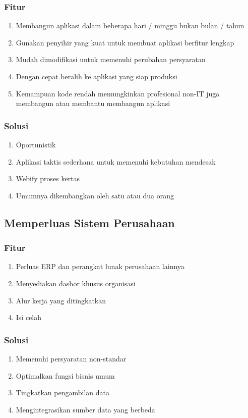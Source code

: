 \documentclass{article}
\begin{document}
\subsubsection{Fitur}
\begin{enumerate}
    \item Membangun aplikasi dalam beberapa hari / minggu bukan bulan / tahun
    \item Gunakan penyihir yang kuat untuk membuat aplikasi berfitur lengkap
    \item Mudah dimodifikasi untuk memenuhi perubahan persyaratan
    \item Dengan cepat beralih ke aplikasi yang siap produksi
    \item Kemampuan kode rendah memungkinkan profesional non-IT juga membangun atau membantu membangun aplikasi
    \end{enumerate}
\subsubsection{Solusi}
\begin{enumerate}
    \item Oportunistik
    \item Aplikasi taktis sederhana untuk memenuhi kebutuhan mendesak
    \item Webify proses kertas
    \item Umumnya dikembangkan oleh satu atau dua orang
    \end{enumerate}
 
\subsection{Memperluas Sistem Perusahaan}
\subsubsection{Fitur}
\begin{enumerate}  
    \item Perluas ERP dan perangkat lunak perusahaan lainnya
    \item Menyediakan dasbor khusus organisasi
    \item Alur kerja yang ditingkatkan
    \item Isi celah
    \end{enumerate}
\subsubsection{Solusi}
\begin{enumerate}  
    \item Memenuhi persyaratan non-standar
    \item Optimalkan fungsi bisnis umum
    \item Tingkatkan pengambilan data
    \item Mengintegrasikan sumber data yang berbeda
 \end{enumerate}
 
\end{document}
